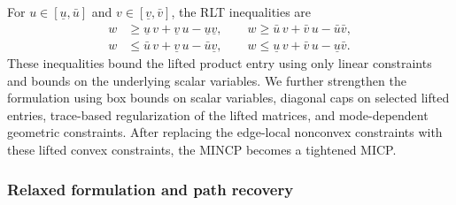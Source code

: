 \documentclass[letterpaper, 10 pt, journal, twoside]{IEEEtran}
\begin{document}
For $u\in[\underline u,\bar u]$ and $v\in[\underline v,\bar v]$, the RLT inequalities are
\begin{equation}\label{eq:rlt_example}
\begin{aligned}
w &\ge \underline u\, v + \underline v\, u - \underline u \underline v, \qquad
w \ge \bar u\, v + \bar v\, u - \bar u \bar v,\\
w &\le \bar u\, v + \underline v\, u - \bar u \underline v, \qquad
w \le \underline u\, v + \bar v\, u - \underline u \bar v.
\end{aligned}
\end{equation}
These inequalities bound the lifted product entry using only linear constraints and bounds on the underlying scalar variables.
We further strengthen the formulation using box bounds on scalar variables, diagonal caps on selected lifted entries, trace-based regularization of the lifted matrices, and mode-dependent geometric constraints.
After replacing the edge-local nonconvex constraints with these lifted convex constraints, the MINCP becomes a tightened MICP.

\subsubsection{Relaxed formulation and path recovery}
\end{document}
